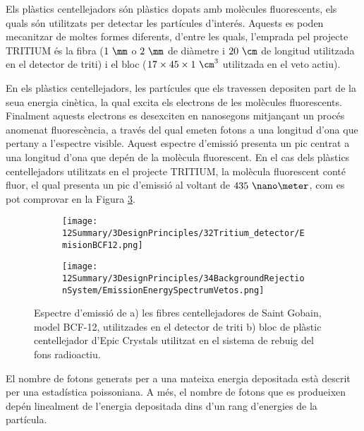 Els plàstics centellejadors són plàstics dopats amb molècules fluorescents, els quals són utilitzats per detectar les partícules d'interés. Aquests es poden mecanitzar de moltes formes diferents, d'entre les quals, l'emprada pel projecte TRITIUM és la fibra ($1~\mm$ o $2~\mm$ de diàmetre i $20~\cm$ de longitud utilitzada en el detector de triti) i el bloc ($17\times 45 \times 1 ~\cm^3$ utilitzada en el veto actiu). 

En els plàstics centellejadors, les partícules que els travessen depositen part de la seua energia cinètica, la qual excita els electrons de les molècules fluorescents. Finalment aquests electrons es desexciten en nanosegons mitjançant un procés anomenat fluorescència, a través del qual emeten fotons a una longitud d'ona que pertany a l'espectre visible. Aquest espectre d'emissió presenta un pic centrat a una longitud d'ona que depén de la molècula fluorescent. En el cas dels plàstics centellejadors utilitzats en el projecte TRITIUM, la molècula fluorescent conté fluor, el qual presenta un pic d'emissió al voltant de $435~\nano\meter$, com es pot comprovar en la Figura \ref{fig:EspectreEmisioPlasticsTRITIUM}.
\begin{figure}
\centering
    \begin{subfigure}[b]{0.7\textwidth}
    \centering
    \texttt{[image: 12Summary/3DesignPrinciples/32Tritium\_detector/EmisionBCF12.png]}  
        \caption{}\label{subfig:EspectreEmisioFibres}
    \end{subfigure}
    \hfill
    \begin{subfigure}[b]{0.7\textwidth}
    \centering
    \texttt{[image: 12Summary/3DesignPrinciples/34BackgroundRejectionSystem/EmissionEnergySpectrumVetos.png]}  
    \caption{\label{subfig:EspectreEmisioVeto}}
    \end{subfigure}
\caption{Espectre d'emissió de a) les fibres centellejadores de Saint Gobain, model BCF-12, utilitzades en el detector de triti \cite{DataSheetBCF12Fiber} b) bloc de plàstic centellejador d'Epic Crystals utilitzat en el sistema de rebuig del fons radioactiu\cite{ScintillatorVeto}\label{fig:EspectreEmisioPlasticsTRITIUM}.}
\end{figure}
El nombre de fotons generats per a una mateixa energia depositada està descrit per una estadística poissoniana. A més, el nombre de fotons que es produeixen depén linealment de l'energia depositada dins d'un rang d'energies de la partícula.

